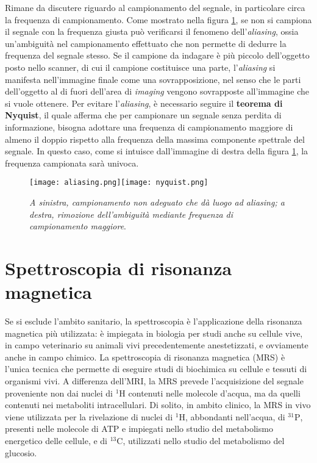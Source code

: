 \documentclass{report}
\newcommand{\figref}[1]{figura \ref{#1}}
\numberwithin{equation}{section}
\numberwithin{figure}{section}
\begin{document}
Rimane da discutere riguardo al campionamento del segnale, in particolare circa la frequenza di campionamento. Come mostrato nella \figref{fig:aliasing}, se non si campiona il segnale con la frequenza giusta può verificarsi il fenomeno dell'\textit{aliasing}, ossia un'ambiguità nel campionamento effettuato che non permette di dedurre la frequenza del segnale stesso. Se il campione da indagare è più piccolo dell'oggetto posto nello scanner, di cui il campione costituisce una parte, l'\textit{aliasing} si manifesta nell'immagine finale come una sovrapposizione, nel senso che le parti dell'oggetto al di fuori dell'area di \textit{imaging} vengono sovrapposte all'immagine che si vuole ottenere. Per evitare l'\textit{aliasing}, è necessario seguire il \textbf{teorema di Nyquist}, il quale afferma che per campionare un segnale senza perdita di informazione, bisogna adottare una frequenza di campionamento maggiore di almeno il doppio rispetto alla frequenza della massima componente spettrale del segnale. In questo caso, come si intuisce dall'immagine di destra della \figref{fig:aliasing}, la frequenza campionata sarà univoca.

\begin{figure}[htp]
\centering
\texttt{[image: aliasing.png]}\quad\texttt{[image: nyquist.png]}
\caption{\label{fig:aliasing} \textit{A sinistra, campionamento non adeguato che dà luogo ad aliasing; a destra, rimozione dell'ambiguità mediante frequenza di campionamento maggiore}.}
\end{figure}

\section{Spettroscopia di risonanza magnetica}
Se si esclude l'ambito sanitario, la spettroscopia è l'applicazione della risonanza magnetica più utilizzata: è impiegata in biologia per studi anche su cellule vive, in campo veterinario su animali vivi precedentemente anestetizzati, e ovviamente anche in campo chimico. La spettroscopia di risonanza magnetica (MRS) è l'unica tecnica che permette di eseguire studi di biochimica su cellule e tessuti di organismi vivi. A differenza dell'MRI, la MRS prevede l'acquisizione del segnale proveniente non dai nuclei di $\mathrm{^1H}$ contenuti nelle molecole d'acqua, ma da quelli contenuti nei metaboliti intracellulari. Di solito, in ambito clinico, la MRS in vivo viene utilizzata per la rivelazione di nuclei di $\mathrm{^1H}$, abbondanti nell'acqua, di $\mathrm{^{31}P}$, presenti nelle molecole di ATP e impiegati nello studio del metabolismo energetico delle cellule, e di $\mathrm{^{13}C}$, utilizzati nello studio del metabolismo del glucosio.
\end{document}

